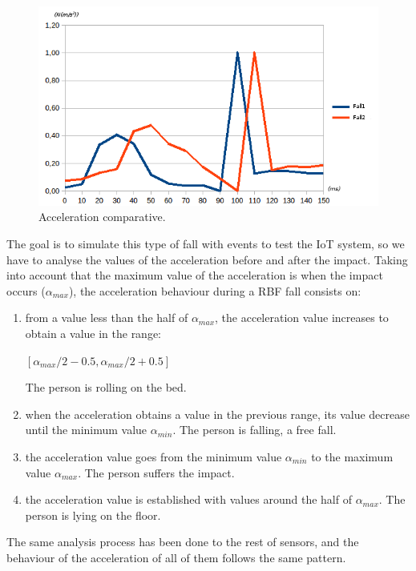 \documentclass[conference]{IEEEtran}
\theoremstyle{definition}
\begin{document}
\begin{figure}[!h]
  \centering
  \includegraphics[scale=0.4]{img/Comparativa}
  \caption[Acceleration comparative]{Acceleration comparative.}
  \label{fig:Sensor1}
\end{figure}

The goal is to simulate this type of fall with events to test the IoT system, so we have to analyse the values of 
the acceleration before and after the impact. Taking into account that the maximum value of the acceleration is 
when the impact occurs ($\alpha_{max}$), the acceleration behaviour during a RBF fall consists on:
\begin{enumerate}
 \item from a value less than the half of $\alpha_{max}$, the acceleration value increases to obtain a value in the range:
  \begin{center}
  $[\alpha_{max}/2 - 0.5, \alpha_{max}/2 + 0.5]$
  \end{center}
 The person is rolling on the bed.
 \item when the acceleration obtains a value in the previous range, its value decrease until the minimum value $\alpha_{min}$.
 The person is falling, a free fall.
 \item the acceleration value goes from the minimum value $\alpha_{min}$ to the maximum value $\alpha_{max}$. The person
 suffers the impact.
 \item the acceleration value is established with values around the half of $\alpha_{max}$. The person is lying on the floor. 
\end{enumerate}

The same analysis process has been done to the rest of sensors, and the behaviour of the acceleration of all of them 
follows the same pattern.
\end{document}
